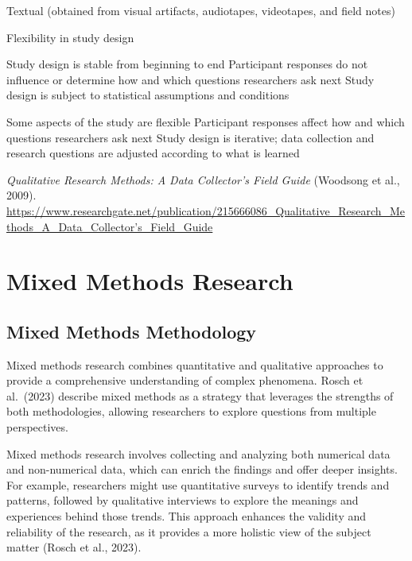 \documentclass[
  letterpaper,
  DIV=11,
  numbers=noendperiod]{scrreprt}
\begin{document}
Textual (obtained from visual artifacts, audiotapes, videotapes, and
field notes)

Flexibility in study design

Study design is stable from beginning to end Participant responses do
not influence or determine how and which questions researchers ask next
Study design is subject to statistical assumptions and conditions

Some aspects of the study are flexible Participant responses affect how
and which questions researchers ask next Study design is iterative; data
collection and research questions are adjusted according to what is
learned

\emph{Qualitative Research Methods: A Data Collector's Field Guide}
(Woodsong et al., 2009).
\url{https://www.researchgate.net/publication/215666086_Qualitative_Research_Methods_A_Data_Collector’s_Field_Guide}


\chapter*{Mixed Methods Research}\label{mixed-methods-research}


\section*{Mixed Methods Methodology}\label{mixed-methods-methodology}


Mixed methods research combines quantitative and qualitative approaches
to provide a comprehensive understanding of complex phenomena. Rosch et
al.~(2023) describe mixed methods as a strategy that leverages the
strengths of both methodologies, allowing researchers to explore
questions from multiple perspectives.

Mixed methods research involves collecting and analyzing both numerical
data and non-numerical data, which can enrich the findings and offer
deeper insights. For example, researchers might use quantitative surveys
to identify trends and patterns, followed by qualitative interviews to
explore the meanings and experiences behind those trends. This approach
enhances the validity and reliability of the research, as it provides a
more holistic view of the subject matter (Rosch et al., 2023).
\end{document}
